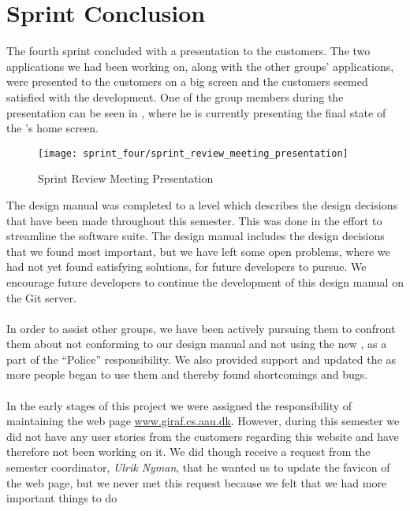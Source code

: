 
\chapter{Sprint Conclusion}
\label{cha:conclusion_sprint_4}

The fourth sprint concluded with a presentation to the customers. The two applications we had been working on, along with the other groups' applications, were presented to the customers on a big screen and the customers seemed satisfied with the development. One of the group members during the presentation can be seen in , where he is currently presenting the final state of the \launcher 's home screen.

\begin{figure}[!htbp]
    \centering
    \texttt{[image: sprint\_four/sprint\_review\_meeting\_presentation]}
    \caption{Sprint Review Meeting Presentation}
    \label{fig:sprint_review_meeting_presentation}
\end{figure}

\FloatBarrier

The design manual was completed to a level which describes the design decisions that have been made throughout this semester. This was done in the effort to streamline the \giraf software suite. The design manual includes the design decisions that we found most important, but we have left some open problems, where we had not yet found satisfying solutions, for future \giraf developers to pursue. We encourage future \giraf developers to continue the development of this design manual on the \giraf Git server.
\\\\
In order to assist other groups, we have been actively pursuing them to confront them about not conforming to our design manual and not using the new \gc, as a part of the ``\giraf Police'' responsibility. We also provided support and updated the \gc as more people began to use them and thereby found shortcomings and bugs. 
\\\\
In the early stages of this project we were assigned the responsibility of maintaining the web page \url{www.giraf.cs.aau.dk}. However, during this semester we did not have any user stories from the customers regarding this website and have therefore not been working on it. We did though receive a request from the semester coordinator, \emph{Ulrik Nyman}, that he wanted us to update the favicon of the web page, but we never met this request because we felt that we had more important things to do